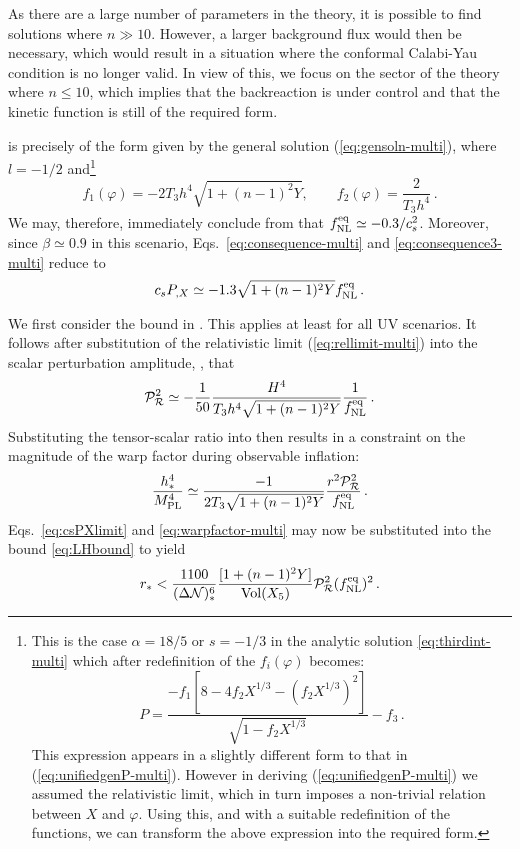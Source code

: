 As there are a large
number of 
parameters in the theory, it is possible to find solutions 
where $n \gg 10$. However, a larger background flux would then be necessary, which
would result 
in a situation where the conformal 
Calabi-Yau condition is no longer valid. In view of this, we focus on
the sector of the theory where $n \le 10$, which implies that the 
backreaction is under control and that the kinetic function
is still of the required form. 


 is precisely of the form given by the 
general solution (\ref{eq:gensoln-multi}), where $l=-1/2$ 
and\footnote{This is the
case $\alpha =18/5$ or $s=-1/3$ in the analytic solution
\eqref{eq:thirdint-multi} which after redefinition of the $f_i (\varphi)$
becomes:
% 
\begin{equation}
P = \frac{-f_1\left[8 - 4f_2X^{1/3}
-\left(f_2X^{1/3}\right)^2\right]}{\sqrt{1-f_2X^{1/3}}} -f_3 \, .
\end{equation}
% 
This expression appears in a slightly different 
form to that in (\ref{eq:unifiedgenP-multi}). 
However in deriving (\ref{eq:unifiedgenP-multi}) we assumed the
relativistic limit, which in turn imposes a non-trivial 
relation between $X$ and $\varphi$. Using this, and with a 
suitable redefinition of the functions, we can
transform the above expression into the required form.} 
% 
\begin{equation}
\label{eq:fdefns-multi}
f_1 (\varphi) = -2T_3 h^4 \sqrt{1+(n-1)^2Y} , \qquad 
f_2 (\varphi) = \frac{2}{T_3 h^4} \,.
\end{equation}
% 
We may, therefore, immediately conclude from  that
$f_{\mathrm{NL}}^{\mathrm{eq}}
\simeq -0.3/c_s^2$. Moreover, since $\beta \simeq 0.9$ in this scenario, 
Eqs.~\eqref{eq:consequence-multi} and \eqref{eq:consequence3-multi} reduce to  
% 
\begin{equation}
\label{eq:csPXlimit}
c_sP_{,X} \simeq -1.3 \sqrt{1+(n-1)^2Y} f_{\mathrm{NL}}^{\mathrm{eq}} \,.
\end{equation}
% 


We first consider the bound in . This applies at least for all
UV scenarios. It follows after substitution of the relativistic limit
(\ref{eq:rellimit-multi}) into the scalar perturbation amplitude,
,
that 
% 
\begin{equation}
\label{eq:usefulPs-multi}
\mathcal{P}_{\mathcal{R}}^2  \simeq -\frac{1}{50} \frac{H^4}{T_3 h^4\sqrt{1+(n-1)^2Y}}
\frac{1}{f_{\mathrm{NL}}^{\mathrm{eq}}}\,.
\end{equation}
% 
Substituting the tensor-scalar ratio into  
 then results in a constraint on the magnitude of 
the warp factor during observable inflation:
%  
\begin{equation}
\label{eq:warpfactor-multi}
\frac{h^4_*}{M_{\mathrm{PL}}^4} \simeq \frac{-1}{2 T_3 \sqrt{1+(n-1)^2Y}} 
\frac{r^2 \mathcal{P}_{\mathcal{R}}^2 }{f_{\mathrm{NL}}^{\mathrm{eq}}} \,.
\end{equation}
% 
Eqs.~\eqref{eq:csPXlimit} and \eqref{eq:warpfactor-multi} may now be
substituted into 
the bound \eqref{eq:LHbound} to yield
%  
\begin{equation}
\label{eq:actualLH-multi}
r_* < \frac{1100}{(\Delta \mathcal{N} )_*^6} 
\frac{[1+(n-1)^2Y]}{\mathrm{Vol} (X_5)} \mathcal{P}_{\mathcal{R}}^2  (f_{\mathrm{NL}}^{\mathrm{eq}})^2 \,.
\end{equation}
% 


